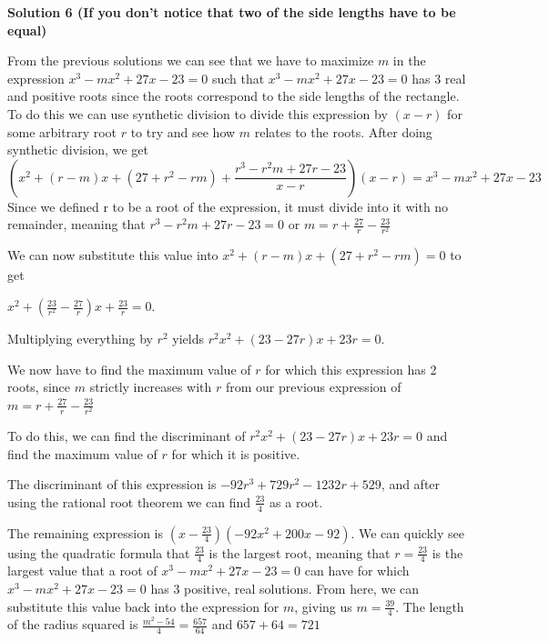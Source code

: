 \begin{enumerate}
\textbf{Solution 6 (If you don't notice that two of the side lengths have to be equal)}

From the previous solutions we can see that we have to maximize $m$ in the expression $x^3 - mx^2 + 27x - 23 = 0$ such that $x^3 - mx^2 + 27x - 23 = 0$ has $3$ real and positive roots since the roots correspond to the side lengths of the rectangle. To do this we can use synthetic division to divide this expression by $(x - r)$ for some arbitrary root $r$ to try and see how $m$ relates to the roots. After doing synthetic division, we get 
 \[(x^2 + (r - m)x + (27 + r^2 - rm) + \frac{r^3 - r^2m + 27r - 23}{x - r})(x - r) = x^3 - mx^2 + 27x - 23\]Since we defined r to be a root of the expression, it must divide into it with no remainder, meaning that $r^3-r^2m+27r-23=0$ or $m = r + \frac{27}{r} - \frac{23}{r^2}$ 

 We can now substitute this value into $x^2 + (r-m)x + (27 + r^2 - rm)=0$ to get 

 $x^2 + (\frac{23}{r^2} - \frac{27}{r})x + \frac{23}{r} = 0$.

 Multiplying everything by $r^2$ yields $r^2x^2 + (23-27r)x + 23r = 0$. 

 We now have to find the maximum value of $r$ for which this expression has 2 roots, since $m$ strictly increases with $r$ from our previous expression of $m = r + \frac{27}{r} - \frac{23}{r^2}$

 To do this, we can find the discriminant of $r^2x^2 + (23-27r)x + 23r = 0$ and find the maximum value of $r$ for which it is positive. 

 The discriminant of this expression is $-92r^3 + 729r^2 - 1232r + 529$, and after using the rational root theorem we can find $\frac{23}{4}$ as a root. 

 The remaining expression is $(x - \frac{23}{4})(-92x^2 + 200x - 92)$. We can quickly see using the quadratic formula that $\frac{23}{4}$ is the largest root, meaning that $r=\frac{23}{4}$ is the largest value that a root of $x^3 - mx^2 + 27x - 23 = 0$ can have for which $x^3 - mx^2 + 27x - 23=0$ has $3$ positive, real solutions. From here, we can substitute this value back into the expression for $m$, giving us $m = \frac{39}{4}$. The length of the radius squared is $\frac{m^2-54}{4}=\frac{657}{64}$ and $657+64=\boxed{721}$



\end{enumerate}